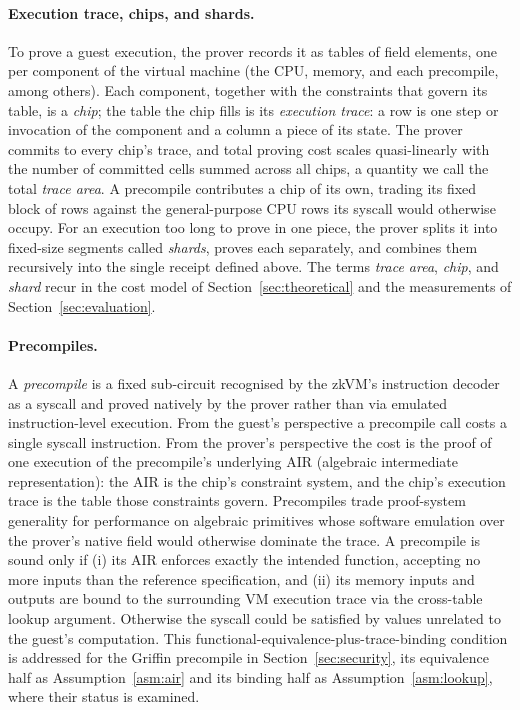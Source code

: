 \paragraph{Execution trace, chips, and shards.}
To prove a guest execution, the prover records it as tables of field elements, one per component of the virtual machine (the CPU, memory, and each precompile, among others). Each component, together with the constraints that govern its table, is a \emph{chip}; the table the chip fills is its \emph{execution trace}: a row is one step or invocation of the component and a column a piece of its state. The prover commits to every chip's trace, and total proving cost scales quasi-linearly with the number of committed cells summed across all chips, a quantity we call the total \emph{trace area}. A precompile contributes a chip of its own, trading its fixed block of rows against the general-purpose CPU rows its syscall would otherwise occupy. For an execution too long to prove in one piece, the prover splits it into fixed-size segments called \emph{shards}, proves each separately, and combines them recursively into the single receipt defined above. The terms \emph{trace area}, \emph{chip}, and \emph{shard} recur in the cost model of Section~\ref{sec:theoretical} and the measurements of Section~\ref{sec:evaluation}.

\paragraph{Precompiles.}
A \emph{precompile} is a fixed sub-circuit recognised by the zkVM's instruction decoder as a syscall and proved natively by the prover rather than via emulated instruction-level execution. From the guest's perspective a precompile call costs a single syscall instruction. From the prover's perspective the cost is the proof of one execution of the precompile's underlying AIR (algebraic intermediate representation): the AIR is the chip's constraint system, and the chip's execution trace is the table those constraints govern. Precompiles trade proof-system generality for performance on algebraic primitives whose software emulation over the prover's native field would otherwise dominate the trace. A precompile is sound only if (i) its AIR enforces exactly the intended function, accepting no more inputs than the reference specification, and (ii) its memory inputs and outputs are bound to the surrounding VM execution trace via the cross-table lookup argument. Otherwise the syscall could be satisfied by values unrelated to the guest's computation. This functional-equivalence-plus-trace-binding condition is addressed for the Griffin precompile in Section~\ref{sec:security}, its equivalence half as Assumption~\ref{asm:air} and its binding half as Assumption~\ref{asm:lookup}, where their status is examined.

